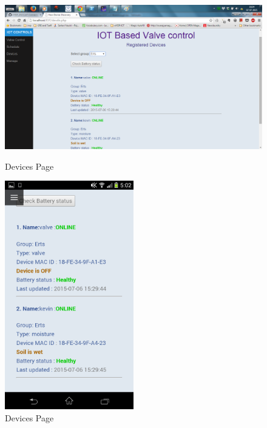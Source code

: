 \documentclass[16pt]{article}
\begin{document}
	\begin{figure}
		\includegraphics[width=1.2\textwidth]{images/devices.png}
		\caption{Devices Page}
		\includegraphics[width=0.5\textwidth]{images/devices_page.png}
		\caption{Devices Page}
	\end{figure}
\end{document}
